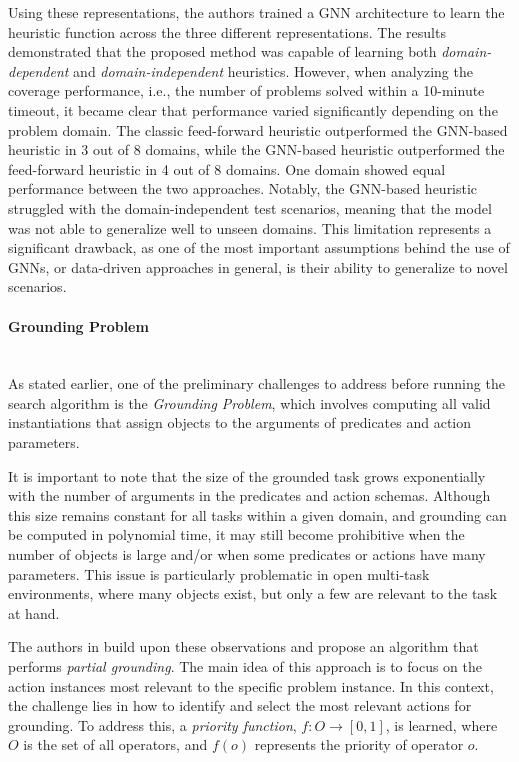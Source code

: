 Using these representations, the authors trained a GNN architecture to learn the heuristic function across the three different representations. The results demonstrated that the proposed method was capable of learning both \textit{domain-dependent} and \textit{domain-independent} heuristics. However, when analyzing the coverage performance, i.e., the number of problems solved within a 10-minute timeout, it became clear that performance varied significantly depending on the problem domain. The classic feed-forward heuristic outperformed the GNN-based \\ heuristic in 3 out of 8 domains, while the GNN-based heuristic outperformed the feed-forward heuristic in 4 out of 8 domains. One domain showed equal performance between the two approaches. Notably, the GNN-based heuristic struggled with the domain-independent test scenarios, meaning that the model was not able to generalize well to unseen domains. This limitation represents a significant drawback, as one of the most important assumptions behind the use of GNNs, or data-driven approaches in general, is their ability to generalize to novel scenarios.

\paragraph*{Grounding Problem}\mbox{}\\
As stated earlier, one of the preliminary challenges to address before running the search algorithm is the \textit{Grounding Problem}, which involves computing all valid instantiations that assign objects to the arguments of predicates and action parameters.

It is important to note that the size of the grounded task grows exponentially with the number of arguments in the predicates and action schemas. Although this size remains constant for all tasks within a given domain, and grounding can be computed in polynomial time, it may still become prohibitive when the number of objects is large and/or when some predicates or actions have many parameters. This issue is particularly problematic in open multi-task environments, where many objects exist, but only a few are relevant to the task at hand.

The authors in \cite{gnad2019learning} build upon these observations and propose an algorithm that performs \textit{partial grounding}. The main idea of this approach is to focus on the action instances most relevant to the specific problem instance. In this context, the challenge lies in how to identify and select the most relevant actions for grounding. To address this, a \textit{priority function}, $f: O \rightarrow \left[0, 1\right]$, is learned, where $O$ is the set of all operators, and $f(o)$ represents the priority of operator $o$.

